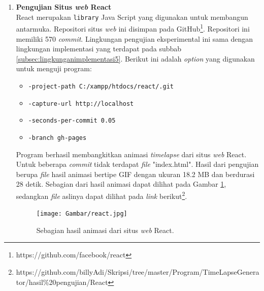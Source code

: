 \begin{enumerate}
\item \textbf{Pengujian Situs \textit{web} React}\\
React merupakan \texttt{library} Java Script yang digunakan untuk membangun antarmuka. Repositori situs \textit{web} ini disimpan pada GitHub\footnote{https://github.com/facebook/react}. Repositori ini memiliki 570 \textit{commit}. Lingkungan pengujian eksperimental ini sama dengan lingkungan implementasi yang terdapat pada subbab \ref{subsec:lingkunganimplementasi5}. Berikut ini adalah \textit{option} yang digunakan untuk menguji program:
\begin{itemize}
\item \texttt{-project-path C:/xampp/htdocs/react/.git}
\item \texttt{-capture-url http://localhost}
\item \texttt{-seconds-per-commit 0.05}
\item \texttt{-branch gh-pages} 
\end{itemize}
Program berhasil membangkitkan animasi \textit{timelapse} dari situs \textit{web} React. Untuk beberapa \textit{commit} tidak terdapat \textit{file} "index.html". Hasil dari pengujian berupa \textit{file} hasil animasi bertipe GIF dengan ukuran 18.2 MB dan berdurasi 28 detik. Sebagian dari hasil animasi dapat dilihat pada Gambar \ref{fig:hasil_react}, sedangkan \textit{file} aslinya dapat dilihat pada \textit{link} berikut\footnote{https://github.com/billyAdi/Skripsi/tree/master/Program/TimeLapseGenerator/hasil\%20pengujian/React}.


\begin{figure}[H]	
		\texttt{[image: Gambar/react.jpg]}
	\caption{Sebagian hasil animasi dari situs \textit{web} React.}
	\label{fig:hasil_react}
\end{figure}





\end{enumerate}
